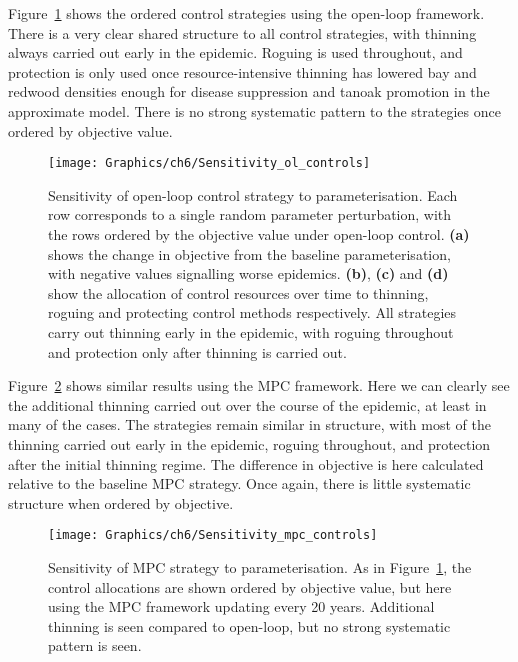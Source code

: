 Figure~\ref{fig:ch6:ol_sensitivity} shows the ordered control strategies using the open-loop framework. There is a very clear shared structure to all control strategies, with thinning always carried out early in the epidemic. Roguing is used throughout, and protection is only used once resource-intensive thinning has lowered bay and redwood densities enough for disease suppression and tanoak promotion in the approximate model. There is no strong systematic pattern to the strategies once ordered by objective value.

\begin{figure}
    \begin{center}
        \texttt{[image: Graphics/ch6/Sensitivity\_ol\_controls]}
        \caption[Open-loop control parameter sensitivity]{Sensitivity of open-loop control strategy to parameterisation. Each row corresponds to a single random parameter perturbation, with the rows ordered by the objective value under open-loop control. \textbf{(a)} shows the change in objective from the baseline parameterisation, with negative values signalling worse epidemics. \textbf{(b)}, \textbf{(c)} and \textbf{(d)} show the allocation of control resources over time to thinning, roguing and protecting control methods respectively. All strategies carry out thinning early in the epidemic, with roguing throughout and protection only after thinning is carried out.\label{fig:ch6:ol_sensitivity}}
    \end{center}
\end{figure}

Figure~\ref{fig:ch6:mpc_sensitivity} shows similar results using the MPC framework. Here we can clearly see the additional thinning carried out over the course of the epidemic, at least in many of the cases. The strategies remain similar in structure, with most of the thinning carried out early in the epidemic, roguing throughout, and protection after the initial thinning regime. The difference in objective is here calculated relative to the baseline MPC strategy. Once again, there is little systematic structure when ordered by objective.

\begin{figure}[t]
    \begin{center}
        \texttt{[image: Graphics/ch6/Sensitivity\_mpc\_controls]}
        \caption[MPC strategy parameter sensitivity]{Sensitivity of MPC strategy to parameterisation. As in Figure~\ref{fig:ch6:ol_sensitivity}, the control allocations are shown ordered by objective value, but here using the MPC framework updating every 20 years. Additional thinning is seen compared to open-loop, but no strong systematic pattern is seen.\label{fig:ch6:mpc_sensitivity}}
    \end{center}
\end{figure}

